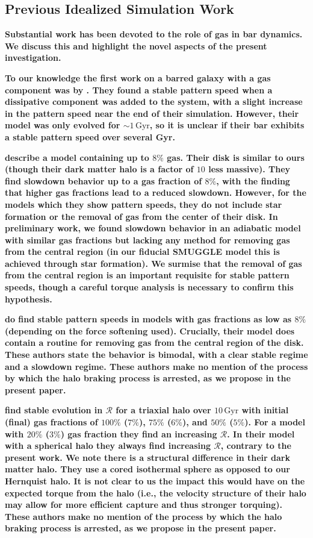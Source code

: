 \documentclass[twocolumn,linenumbers,trackchanges]{aastex631}
\newcommand{\Rot}{\ensuremath{\mathcal{R}}}
\begin{document}
\subsection{Previous Idealized Simulation Work}
{\bf Substantial work has been devoted to the role of gas in bar dynamics. We
discuss this and highlight the novel aspects of the present investigation.}

{\bf To our knowledge the first work on a barred galaxy with a gas component was
by \citet{1993AA...268...65F}. They found a stable pattern speed when a
dissipative component was added to the system, with a slight increase in the
pattern speed near the end of their simulation. However, their model was only
evolved for $\sim1\,\textrm{Gyr}$, so it is unclear if their bar exhibits a
stable pattern speed over several Gyr.}

{\bf \citet{2007ApJ...666..189B} describe a model containing up to $8\%$ gas.
Their disk is similar to ours (though their dark matter halo is a factor of $10$
less massive). They find slowdown behavior up to a gas fraction of $8\%$, with
the finding that higher gas fractions lead to a reduced slowdown. However, for
the models which they show pattern speeds, they do not include star formation or
the removal of gas from the center of their disk. In preliminary work, we found
slowdown behavior in an adiabatic model with similar gas fractions but lacking
any method for removing gas from the central region (in our fiducial SMUGGLE
model this is achieved through star formation). We surmise that the removal of
gas from the central region is an important requisite for stable pattern speeds,
though a careful torque analysis is necessary to confirm this hypothesis.}

{\bf \citet{2010ApJ...719.1470V} do find stable pattern speeds in models with
gas fractions as low as $8\%$ (depending on the force softening used).
Crucially, their model does contain a routine for removing gas from the central
region of the disk. These authors state the behavior is bimodal, with a clear
stable regime and a slowdown regime. These authors make no mention of the
process by which the halo braking process is arrested, as we propose in the
present paper.}

{\bf \citet{2013MNRAS.429.1949A, 2014MNRAS.438L..81A} find stable evolution in
\Rot{} for a triaxial halo over $10\,\textrm{Gyr}$ with initial (final) gas
fractions of $100\%$ ($7\%$), $75\%$ ($6\%$), and $50\%$ ($5\%$). For a model
with $20\%$ ($3\%$) gas fraction they find an increasing \Rot{}. In their model
with a spherical halo they always find increasing \Rot{}, contrary to the
present work. We note there is a structural difference in their dark matter
halo. They use a cored isothermal sphere as opposed to our Hernquist halo. It is
not clear to us the impact this would have on the expected torque from the halo
(i.e., the velocity structure of their halo may allow for more efficient capture
and thus stronger torquing). These authors make no mention of the process by
which the halo braking process is arrested, as we propose in the present paper.}
\end{document}
